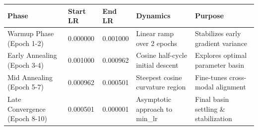 \begin{tabular}{lllll}
\toprule
Phase & Start LR & End LR & Dynamics & Purpose \\
\midrule
Warmup Phase (Epoch 1-2) & 0.000000 & 0.001000 & Linear ramp over 2 epochs & Stabilizes early gradient variance \\
Early Annealing (Epoch 3-4) & 0.001000 & 0.000962 & Cosine half-cycle initial descent & Explores optimal parameter basin \\
Mid Annealing (Epoch 5-7) & 0.000962 & 0.000501 & Steepest cosine curvature region & Fine-tunes cross-modal alignment \\
Late Convergence (Epoch 8-10) & 0.000501 & 0.000001 & Asymptotic approach to min\_lr & Final basin settling \& stabilization \\
\bottomrule
\end{tabular}
